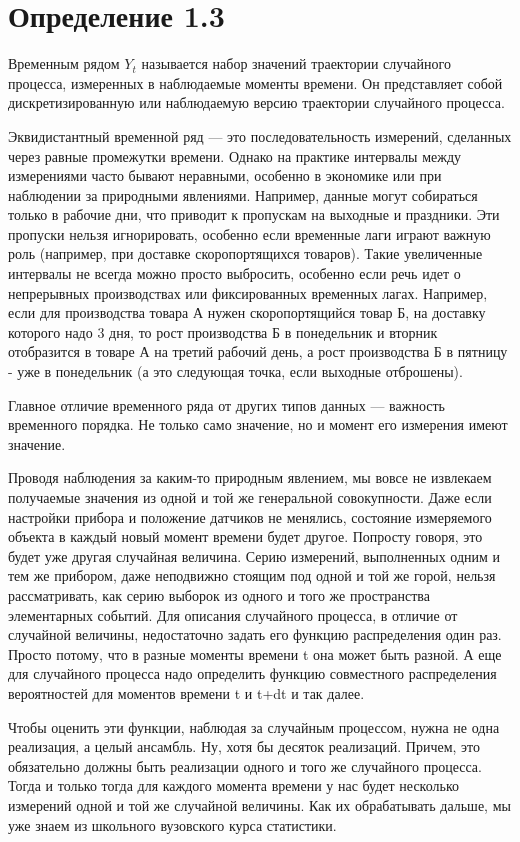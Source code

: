 \section*{Определение 1.3} Временным рядом \( Y_t \) называется
набор значений траектории случайного процесса,
измеренных в наблюдаемые моменты времени. Он представляет собой
дискретизированную или наблюдаемую версию траектории случайного процесса.

Эквидистантный временной ряд — это последовательность измерений,
сделанных через равные промежутки времени. Однако на практике
интервалы между измерениями часто бывают неравными, особенно в
экономике или при наблюдении за природными явлениями. Например,
данные могут собираться только в рабочие дни, что приводит к
пропускам на выходные и праздники. Эти пропуски нельзя
игнорировать, особенно если временные лаги играют важную роль
(например, при доставке скоропортящихся товаров).
Такие увеличенные интервалы не всегда можно просто выбросить, особенно
если речь идет о непрерывных производствах или фиксированных временных лагах.
Например, если для производства товара А нужен скоропортящийся
товар Б, на доставку которого надо 3 дня, то рост производства Б в
понедельник и вторник отобразится в товаре А на третий рабочий
день, а рост производства Б в пятницу - уже в понедельник (а это
следующая точка, если выходные отброшены).

Главное отличие временного ряда от других типов данных — важность
временного порядка. Не только само значение, но и момент его
измерения имеют значение.

Проводя наблюдения за
каким-то природным явлением, мы вовсе не извлекаем получаемые
значения из одной и той же генеральной совокупности. Даже если
настройки прибора и положение датчиков не менялись, состояние
измеряемого объекта в каждый новый момент времени будет другое.
Попросту говоря, это будет уже другая случайная величина. Серию
измерений, выполненных одним и тем же прибором, даже неподвижно
стоящим под одной и той же горой, нельзя рассматривать, как серию
выборок из одного и того же пространства элементарных событий. Для
описания случайного процесса, в отличие от случайной величины,
недостаточно задать его функцию
распределения один раз. Просто потому, что в разные моменты времени
t она может быть разной. А еще для случайного процесса надо
определить функцию совместного распределения вероятностей для
моментов времени t и t+dt и так далее.

Чтобы оценить эти функции,
наблюдая за случайным процессом, нужна не одна реализация, а целый
ансамбль. Ну, хотя бы десяток реализаций. Причем, это обязательно
должны быть реализации одного и того же случайного процесса. Тогда
и только тогда для каждого момента времени у нас будет несколько
измерений одной и той же случайной величины. Как их обрабатывать
дальше, мы уже знаем из школьного вузовского курса статистики.

